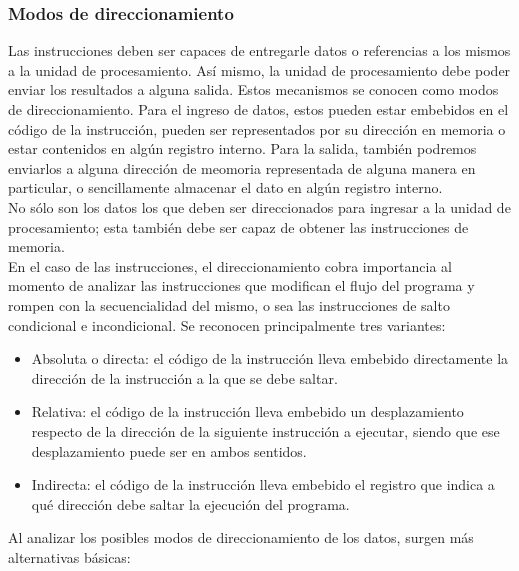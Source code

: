 \subsubsection{Modos de direccionamiento}
\label{subsubsec:theory-modern-data_managment-addressing_modes}

Las instrucciones deben ser capaces de entregarle datos o referencias a los 
mismos a la unidad de procesamiento. Así mismo, la unidad de procesamiento debe 
poder enviar los resultados a alguna salida. Estos mecanismos se conocen como 
modos de direccionamiento. Para el ingreso de datos, estos pueden estar 
embebidos en el código de la instrucción, pueden ser representados por su 
dirección en memoria o estar contenidos en algún registro interno. Para la 
salida, también podremos enviarlos a alguna dirección de meomoria representada 
de alguna manera en particular, o sencillamente almacenar el dato en algún 
registro interno.\\
No sólo son los datos los que deben ser direccionados para ingresar a la unidad 
de procesamiento; esta también debe ser capaz de obtener las instrucciones de 
memoria.\\
En el caso de las instrucciones, el direccionamiento cobra importancia al 
momento de analizar las instrucciones que modifican el flujo del programa y 
rompen con la secuencialidad del mismo, o sea las instrucciones de salto 
condicional e incondicional. Se reconocen principalmente tres variantes:
\begin{itemize}
  \item Absoluta o directa: el código de la instrucción lleva embebido 
directamente la dirección de la instrucción a la que se debe saltar.
  \item Relativa: el código de la instrucción lleva embebido un desplazamiento 
respecto de la dirección de la siguiente instrucción a ejecutar, siendo que ese 
desplazamiento puede ser en ambos sentidos.
  \item Indirecta: el código de la instrucción lleva embebido el registro que 
indica a qué dirección debe saltar la ejecución del programa.
\end{itemize}
Al analizar los posibles modos de direccionamiento de los datos, surgen más 
alternativas básicas:
